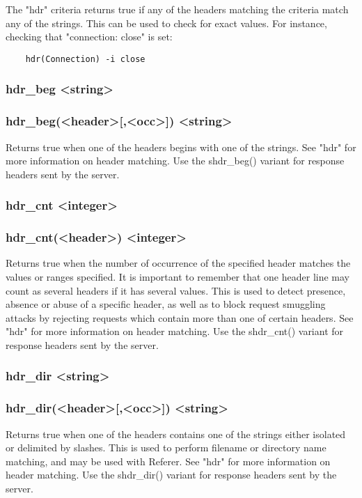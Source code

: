   The "hdr" criteria returns true if any of the headers matching the criteria
  match any of the strings. This can be used to check for exact values. For
  instance, checking that "connection: close" is set:
  \begin{verbatim}
    hdr(Connection) -i close
  \end{verbatim}
     
\subsubsection[hdr\_beg]{hdr\_beg <string>}
\subsubsection{hdr\_beg(<header>[,<occ>]) <string>}
  Returns true when one of the headers begins with one of the strings. See
  "hdr" for more information on header matching. Use the shdr\_beg() variant for
  response headers sent by the server.

\subsubsection[hdr\_cnt]{hdr\_cnt <integer>}
\subsubsection*{hdr\_cnt(<header>) <integer>}
  Returns true when the number of occurrence of the specified header matches
  the values or ranges specified. It is important to remember that one header
  line may count as several headers if it has several values. This is used to
  detect presence, absence or abuse of a specific header, as well as to block
  request smuggling attacks by rejecting requests which contain more than one
  of certain headers. See "hdr" for more information on header matching. Use
  the shdr\_cnt() variant for response headers sent by the server.

\subsubsection[hdr\_dir]{hdr\_dir <string>}
\subsubsection*{hdr\_dir(<header>[,<occ>]) <string>}
  Returns true when one of the headers contains one of the strings either
  isolated or delimited by slashes. This is used to perform filename or
  directory name matching, and may be used with Referer. See "hdr" for more
  information on header matching. Use the shdr\_dir() variant for response
  headers sent by the server.

